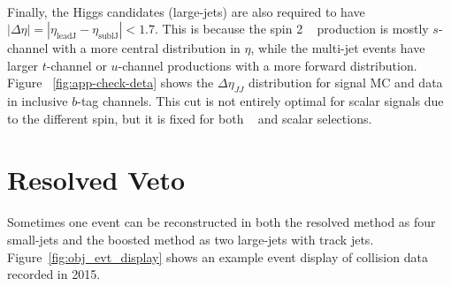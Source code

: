 \paragraph{}
Finally, the Higgs candidates (large-\R jets) are also required to have $|\Delta\eta| = |\eta_{\text{leadJ}} -\eta_{\text{sublJ}} |< 1.7$. 
This is because the spin 2 \Grav~ production is mostly $s$-channel with a more central distribution in $\eta$, while the multi-jet events have larger $t$-channel or $u$-channel productions with a more forward distribution. 
Figure ~\ref{fig:app-check-deta} shows the $\Delta \eta_{JJ}$ distribution for signal MC and data in inclusive $b$-tag channels.
This cut is not entirely optimal for scalar signals due to the different spin, but it is fixed for both \Grav~ and scalar selections.



\section{Resolved Veto}
\label{sec:resollvedveto}

\paragraph{}
Sometimes one event can be reconstructed in both the resolved method as four small-\R jets and the boosted method as two large-\R jets with track jets. Figure~\ref{fig:obj_evt_display} shows an example event display of collision data recorded in 2015.

